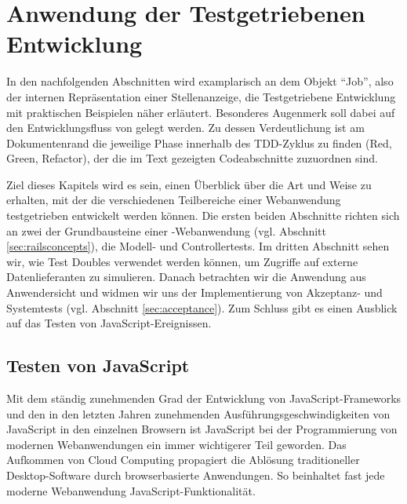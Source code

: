 \chapter{Anwendung der Testgetriebenen Entwicklung}
\label{sec:awtdd}

In den nachfolgenden Abschnitten wird examplarisch an dem Objekt "`Job"', also der internen Repräsentation einer Stellenanzeige, die Testgetriebene Entwicklung mit praktischen Beispielen näher erläutert.
Besonderes Augenmerk soll dabei auf den Entwicklungsfluss von  gelegt werden. Zu dessen Verdeutlichung ist am Dokumentenrand die jeweilige Phase innerhalb des TDD-Zyklus zu finden (Red, Green, Refactor), der die im Text gezeigten Codeabschnitte zuzuordnen sind.

Ziel dieses Kapitels wird es sein, einen Überblick über die Art und Weise zu erhalten, mit der die verschiedenen Teilbereiche einer Webanwendung testgetrieben entwickelt werden können.
Die ersten beiden Abschnitte richten sich an zwei der Grundbausteine einer -Webanwendung (vgl. Abschnitt \ref{sec:railsconcepts}), die Modell- und Controllertests. Im dritten Abschnitt sehen wir, wie Test Doubles verwendet werden können, um Zugriffe auf externe Datenlieferanten zu simulieren. Danach betrachten wir die Anwendung aus Anwendersicht und widmen wir uns der Implementierung von Akzeptanz- und Systemtests (vgl. Abschnitt \ref{sec:acceptance}).
Zum Schluss gibt es einen Ausblick auf das Testen von JavaScript-Ereignissen.






\section{Testen von JavaScript}

Mit dem ständig zunehmenden Grad der Entwicklung von JavaScript-Frameworks und den in den letzten Jahren zunehmenden Ausführungsgeschwindigkeiten von JavaScript in den einzelnen Browsern ist JavaScript bei der Programmierung von modernen Webanwendungen ein immer wichtigerer Teil geworden. Das Aufkommen von Cloud Computing propagiert die Ablösung traditioneller Desktop-Software durch browserbasierte Anwendungen. So beinhaltet fast jede moderne Webanwendung JavaScript-Funktionalität.

